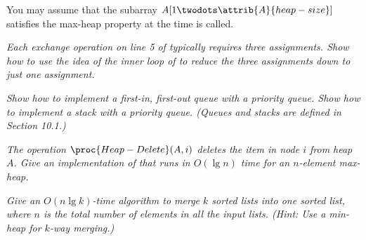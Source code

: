 \begin{description}
{You may assume that the subarray $A[1 \twodots \attrib{A}{heap-size}]$ satisfies the max-heap property at the time  is called.
}

        \begin{exrev}
          
        \end{exrev}
     \textit{Each exchange operation on line 5 of  typically requires
three assignments. Show how to use the idea of the inner loop of  to reduce the three assignments down to just one assignment.}
        \begin{exrev}
          
        \end{exrev}
     \textit{Show how to implement a first-in, first-out queue with a priority queue. Show
how to implement a stack with a priority queue. (Queues and stacks are defined in
Section 10.1.)}
        \begin{exrev}
          
        \end{exrev}
     \textit{The operation $\proc{Heap-Delete}(A,i)$ deletes the item in node $i$ from heap $A$. Give
an implementation of  that runs in $O (\lg n)$ time for an $n$-element
max-heap.}
        \begin{exrev}
          
        \end{exrev}
     \textit{Give an $O(n \lg k)$-time algorithm to merge $k$ sorted lists into one sorted list,
where $n$ is the total number of elements in all the input lists. (Hint: Use a min-heap for $k$-way merging.)}
        \begin{exrev}
          
        \end{exrev}
\end{description}

